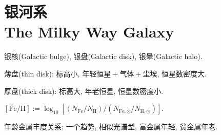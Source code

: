 \chapter{银河系\\The Milky Way Galaxy}

银核(Galactic bulge), 银盘(Galactic disk), 银晕(Galactic halo).

薄盘(thin disk): 标高小, 年轻恒星$\!+\!$气体$\!+\!$尘埃, 恒星数密度大.

厚盘(thick disk): 标高大, 年老恒星, 恒星数密度小.

$[\text{Fe}/\text{H}]:=\log_{10}[(N_\text{Fe}/N_\text{H})/(N_{\text{Fe},\odot}/N_{\text{H},\odot})]$.

年龄金属丰度关系: 一个趋势, 相似光谱型, 富金属年轻, 贫金属年老.
